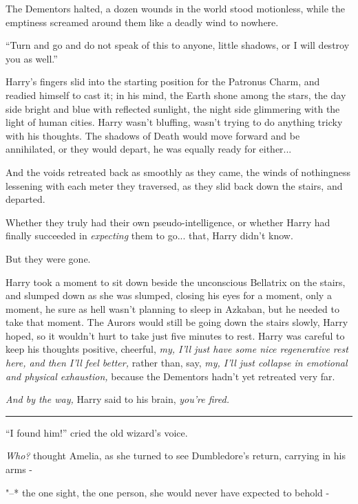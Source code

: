 The Dementors halted, a dozen wounds in the world stood motionless,
while the emptiness screamed around them like a deadly wind to nowhere.

``Turn and go and do not speak of this to anyone, little shadows, or I
will destroy you as well.''

Harry's fingers slid into the starting position for the Patronus Charm,
and readied himself to cast it; in his mind, the Earth shone among the
stars, the day side bright and blue with reflected sunlight, the night
side glimmering with the light of human cities. Harry wasn't bluffing,
wasn't trying to do anything tricky with his thoughts. The shadows of
Death would move forward and be annihilated, or they would depart, he
was equally ready for either...

And the voids retreated back as smoothly as they came, the winds of
nothingness lessening with each meter they traversed, as they slid back
down the stairs, and departed.

Whether they truly had their own pseudo-intelligence, or whether Harry
had finally succeeded in \emph{expecting} them to go... that, Harry
didn't know.

But they were gone.

Harry took a moment to sit down beside the unconscious Bellatrix on the
stairs, and slumped down as she was slumped, closing his eyes for a
moment, only a moment, he sure as hell wasn't planning to sleep in
Azkaban, but he needed to take that moment. The Aurors would still be
going down the stairs slowly, Harry hoped, so it wouldn't hurt to take
just five minutes to rest. Harry was careful to keep his thoughts
positive, cheerful, \emph{my, I'll just have some nice regenerative rest
here, and then I'll feel better,} rather than, say, \emph{my, I'll just
collapse in emotional and physical exhaustion,} because the Dementors
hadn't yet retreated very far.

\emph{And by the way,} Harry said to his brain, \emph{you're fired.}

\begin{center}\rule{3in}{0.4pt}\end{center}

``I found him!'' cried the old wizard's voice.

\emph{Who?} thought Amelia, as she turned to see Dumbledore's return,
carrying in his arms -

"--* the one sight, the one person, she would never have expected to behold
-

